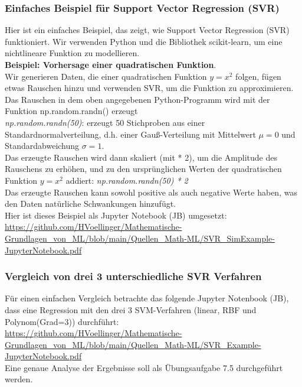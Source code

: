 \documentclass[12pt]{article}
\begin{document}
\subsubsection{Einfaches Beispiel für Support Vector Regression (SVR)}
Hier ist ein einfaches Beispiel, das zeigt, wie Support Vector Regression (SVR) funktioniert. Wir verwenden Python und die Bibliothek scikit-learn, um eine nichtlineare Funktion zu modellieren.\\
\textbf{Beispiel: Vorhersage einer quadratischen Funktion}.\\
Wir generieren Daten, die einer quadratischen Funktion $ y = x^2 $ folgen, fügen etwas Rauschen hinzu und verwenden SVR, um die Funktion zu approximieren.\\
Das Rauschen in dem oben angegebenen Python-Programm wird mit der Funktion np.random.randn() erzeugt\\
\textit{np.random.randn(50)}: erzeugt 50 Stichproben aus einer Standardnormalverteilung, d.h. einer Gauß-Verteilung mit Mittelwert $ \mu = 0 $ und Standardabweichung $ \sigma = 1$.\\
Das erzeugte Rauschen wird dann skaliert (mit * 2), um die Amplitude des Rauschens zu erhöhen, und zu den ursprünglichen Werten der quadratischen Funktion $ y = x^2 $ addiert:
\textit{np.random.randn(50) * 2}\\
Das erzeugte Rauschen kann sowohl positive als auch negative Werte haben, was den Daten natürliche Schwankungen hinzufügt.\\
Hier ist dieses Beispiel als Jupyter Notebook (JB) umgesetzt:\\
\url{https://github.com/HVoellinger/Mathematische-Grundlagen_von_ML/blob/main/Quellen_Math-ML/SVR_SimExample-JupyterNotebook.pdf}\\[0.2cm]
%
\subsubsection{Vergleich von drei 3 unterschiedliche SVR Verfahren}
Für einen einfachen Vergleich betrachte das folgende Jupyter Notenbook (JB), dass eine Regression mit den drei 3 SVM-Verfahren (linear, RBF und Polynom(Grad=3)) durchführt:\\
\url{https://github.com/HVoellinger/Mathematische-Grundlagen_von_ML/blob/main/Quellen_Math-ML/SVR_Example-JupyterNotebook.pdf}\\[0.2cm]
Eine genaue Analyse der Ergebnisse soll als Übungsaufgabe 7.5 durchgeführt werden.\\[0.3cm]
%
\newpage
\end{document}
